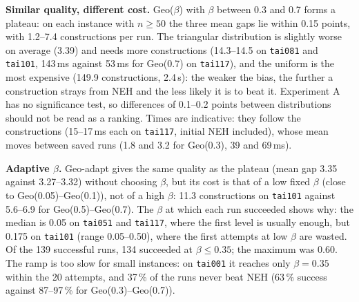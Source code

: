 \documentclass[10pt,a4paper]{article}
\begin{document}
\textbf{Similar quality, different cost.} Geo($\beta$) with $\beta$ between 0.3 and 0.7 forms a
plateau: on each instance with $n\ge50$ the three mean gaps lie within 0.15 points, with 1.2--7.4
constructions per run. The triangular distribution is slightly worse on average (3.39) and needs more constructions
(14.3--14.5 on \texttt{tai081} and \texttt{tai101}, 143\,ms against 53\,ms for Geo(0.7) on
\texttt{tai117}), and the uniform is the most expensive (149.9 constructions, 2.4\,s): the weaker the
bias, the further a construction strays from NEH and the less likely it is to beat it. Experiment A has
no significance test, so differences of 0.1--0.2 points between distributions should not be read as a
ranking. Times are indicative: they follow the constructions (15--17\,ms each on \texttt{tai117}, initial
NEH included), whose mean moves between saved runs (1.8 and 3.2 for Geo(0.3), 39 and 69\,ms).

\textbf{Adaptive $\beta$.} Geo-adapt gives the same quality as the plateau (mean gap 3.35 against
3.27--3.32) without choosing $\beta$, but its cost is that of a low fixed $\beta$ (close to
Geo(0.05)--Geo(0.1)), not of a high $\beta$:
11.3 constructions on \texttt{tai101} against 5.6--6.9 for Geo(0.5)--Geo(0.7). The $\beta$ at which each run succeeded shows why: the median is 0.05 on
\texttt{tai051} and \texttt{tai117}, where the first level is usually enough, but 0.175 on
\texttt{tai101} (range 0.05--0.50), where the first attempts at low $\beta$ are wasted. Of the 139
successful runs, 134 succeeded at $\beta\le0.35$; the maximum was 0.60.
The ramp is too slow for small instances: on \texttt{tai001} it reaches only $\beta=0.35$ within the 20
attempts, and 37\,\% of the runs never beat NEH (63\,\% success against 87--97\,\% for
Geo(0.3)--Geo(0.7)).
\end{document}
